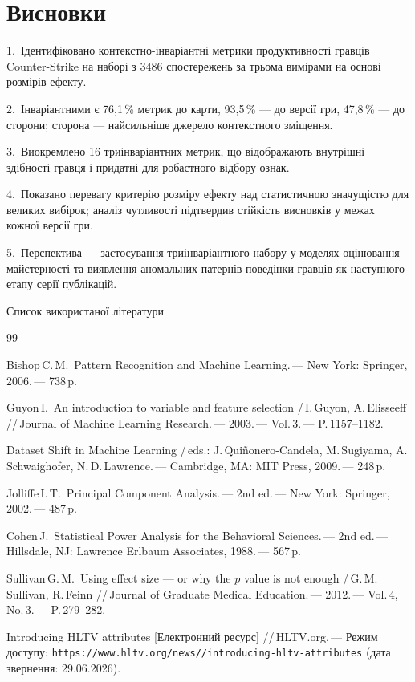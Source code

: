 \section{Висновки}

1.~Ідентифіковано контекстно-інваріантні метрики продуктивності гравців Counter-Strike на наборі
з 3486 спостережень за трьома вимірами на основі розмірів ефекту.

2.~Інваріантними є 76,1\,\% метрик до карти, 93,5\,\% --- до версії гри, 47,8\,\% --- до сторони;
сторона --- найсильніше джерело контекстного зміщення.

3.~Виокремлено 16 триінваріантних метрик, що відображають внутрішні здібності гравця і придатні
для робастного відбору ознак.

4.~Показано перевагу критерію розміру ефекту над статистичною значущістю для великих вибірок;
аналіз чутливості підтвердив стійкість висновків у межах кожної версії гри.

5.~Перспектива --- застосування триінваріантного набору у моделях оцінювання майстерності та
виявлення аномальних патернів поведінки гравців як наступного етапу серії публікацій.

\vspace*{6pt}
\centerline{\normalfont\large\sc Список використаної літератури}
\vspace*{3pt}

\begin{thebibliography}{99}
\begin{small}

Bishop\,C.\,M.\ Pattern Recognition and Machine Learning.\,--- New York: Springer, 2006.\,--- 738\,p.

Guyon\,I.\ An introduction to variable and feature selection /\,I.\,Guyon, A.\,Elisseeff
//\,Journal of Machine Learning Research.\,--- 2003.\,--- Vol.\,3.\,--- P.\,1157--1182.

Dataset Shift in Machine Learning /\,eds.: J.\,Qui\~nonero-Candela, M.\,Sugiyama,
A.\,Schwaighofer, N.\,D.\,Lawrence.\,--- Cambridge, MA: MIT Press, 2009.\,--- 248\,p.

Jolliffe\,I.\,T.\ Principal Component Analysis.\,--- 2nd ed.\,--- New York: Springer,
2002.\,--- 487\,p.

Cohen\,J.\ Statistical Power Analysis for the Behavioral Sciences.\,--- 2nd ed.\,---
Hillsdale, NJ: Lawrence Erlbaum Associates, 1988.\,--- 567\,p.

Sullivan\,G.\,M.\ Using effect size --- or why the $p$ value is not enough /\,G.\,M.\,Sullivan,
R.\,Feinn //\,Journal of Graduate Medical Education.\,--- 2012.\,--- Vol.\,4, No.\,3.\,---
P.\,279--282.

Introducing HLTV attributes [Електронний ресурс] //\,HLTV.org.\,--- Режим доступу:
\texttt{https://\ab www.hltv.org/\ab news//\ab introducing-hltv-attributes}
(дата звернення: 29.06.2026).

\end{small}
\end{thebibliography}


